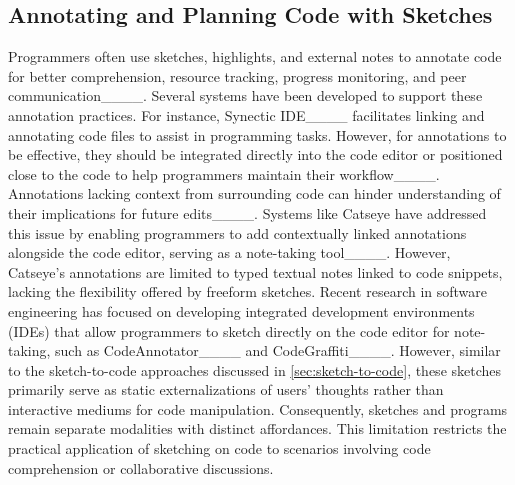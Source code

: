 


\subsection{Annotating and Planning Code with Sketches}
Programmers often use sketches, highlights, and external notes to annotate code for better comprehension, resource tracking, progress monitoring, and peer communication____. Several systems have been developed to support these annotation practices. For instance, Synectic IDE____ facilitates linking and annotating code files to assist in programming tasks. However, for annotations to be effective, they should be integrated directly into the code editor or positioned close to the code to help programmers maintain their workflow____.
Annotations lacking context from surrounding code can hinder understanding of their implications for future edits____. Systems like Catseye have addressed this issue by enabling programmers to add contextually linked annotations alongside the code editor, serving as a note-taking tool____.
However, Catseye's annotations are limited to typed textual notes linked to code snippets, lacking the flexibility offered by freeform sketches.
% 
Recent research in software engineering has focused on developing integrated development environments (IDEs) that allow programmers to sketch directly on the code editor for note-taking, such as CodeAnnotator____ and CodeGraffiti____.
However, similar to the sketch-to-code approaches discussed in \autoref{sec:sketch-to-code}, these sketches primarily serve as static externalizations of users' thoughts rather than interactive mediums for code manipulation.
Consequently, sketches and programs remain separate modalities with distinct affordances. This limitation restricts the practical application of sketching on code to scenarios involving code comprehension or collaborative discussions.




